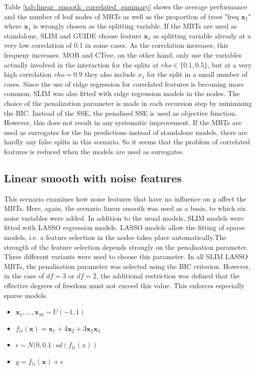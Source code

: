 Table \ref{tab:linear_smooth_correlated_summary} shows the average performance and the number of leaf nodes of MBTs  as well as the proportion of trees "freq $\textbf{x}_1$" where $\textbf{x}_1$ is wrongly chosen as the splitting variable.
If the MBTs are used as standalone, SLIM and GUIDE choose feature $\textbf{x}_1$ as splitting variable already at a very low correlation of 0.1 in some cases. As the correlation increases, this frequeny increases. MOB and CTree, on the other hand, only use the variables actually involved in the interaction for the splits at $rho \in \{0.1, 0.5\}$, but at a very high correlation $rho = 0.9$ they also include $x_1$ for the split in a small number of cases. 
Since the use of ridge regression for correlated features is becoming more common, SLIM was also fitted with ridge regression models in the nodes. The choice of the penalization parameter is made in each recursion step by minimising the BIC. Instead of the SSE, the penalised SSE is used as objective function. However, this does not result in any systematic improvement. 
If the MBTs are used as surrogates for the lm predictions instead of standalone models, there are hardly any false splits in this scenario. So it seems that the problem of correlated features is reduced when the models are used as surrogates.


\subsection{Linear smooth with noise features}
This scenario examines how noise features that have no influence on $y$ affect the MBTs. Here, again, the scenario linear smooth was used as a basis, to which six noise variables were added.
In addition to the usual models, SLIM models were fitted with LASSO regression models. LASSO models allow the fitting of sparse models, i.e. a feature selection in the nodes takes place automatically.The strength of the feature selection depends strongly on the penalisation parameter. Three different variants were used to choose this parameter. In all SLIM LASSO MBTs, the penalisation parameter was selected using the BIC criterion. However, in the case of $df = 3$ or $df = 2$, the additional restriction was defined that the effective degrees of freedom must not exceed this value. This enforces especially sparse models.

\begin{itemize}
    \item $\textbf{x}_1,..., \textbf{x}_{10} \sim U(-1,1)$
    \item $ f_{ls}(\textbf{x}) = \textbf{x}_1 + 4   \textbf{x}_2 + 3   \textbf{x}_2   \textbf{x}_3 $
    \item $\epsilon \sim N(0, 0.1 \cdot sd(f_{ls}(x))$
    \item $y = f_{ls}(\textbf{x}) + \epsilon$
\end{itemize}

